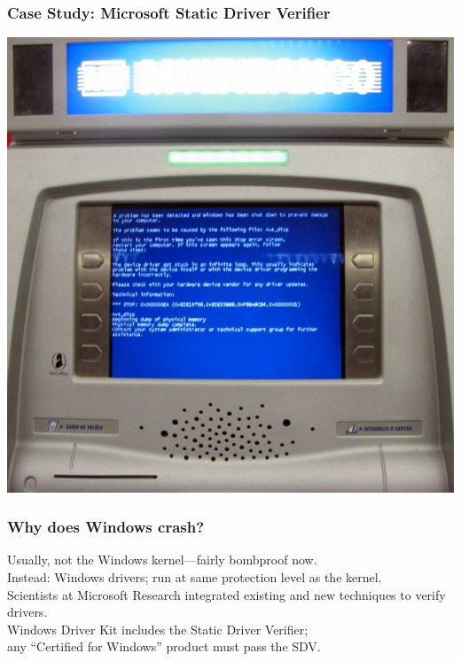 \begin{frame}
\frametitle{Case Study: Microsoft Static Driver Verifier}

\begin{center}
\includegraphics[width=\textwidth]{images/DeLaRue_ATM_Crash.jpg}
\end{center}

\end{frame}

\begin{frame}
\frametitle{Why does Windows crash?}

\begin{changemargin}{1cm}
Usually, not the Windows kernel---fairly bombproof now.\\

Instead: Windows drivers; run at same protection level as the kernel.\\[1em]

Scientists at Microsoft Research integrated existing and new techniques
to verify drivers.\\[1em]

Windows Driver Kit includes
the Static Driver Verifier;\\
 any ``Certified for Windows'' product must pass the SDV.

\end{changemargin}
\end{frame}

